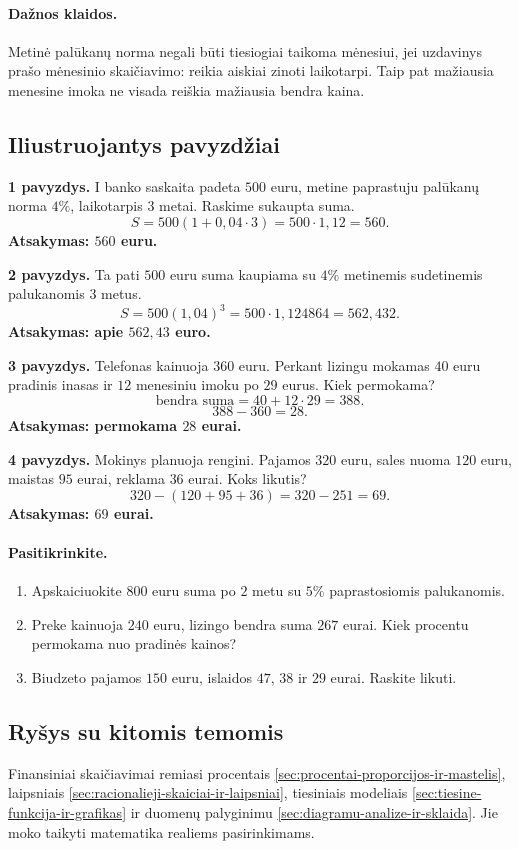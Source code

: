 \paragraph{Dažnos klaidos.}
Metinė palūkanų norma negali būti tiesiogiai taikoma mėnesiui, jei uzdavinys prašo mėnesinio skaičiavimo: reikia aiskiai zinoti laikotarpi. Taip pat mažiausia menesine imoka ne visada reiškia mažiausia bendra kaina.

\subsection{Iliustruojantys pavyzdžiai}
\textbf{1 pavyzdys.} I banko saskaita padeta $500$ euru, metine paprastuju palūkanų norma $4\%$, laikotarpis $3$ metai. Raskime sukaupta suma.
\[
S=500(1+0{,}04\cdot3)=500\cdot1{,}12=560.
\]
\textbf{Atsakymas: $560$ euru.}

\textbf{2 pavyzdys.} Ta pati $500$ euru suma kaupiama su $4\%$ metinemis sudetinemis palukanomis $3$ metus.
\[
S=500(1{,}04)^3=500\cdot1{,}124864=562{,}432.
\]
\textbf{Atsakymas: apie $562{,}43$ euro.}

\textbf{3 pavyzdys.} Telefonas kainuoja $360$ euru. Perkant lizingu mokamas $40$ euru pradinis inasas ir $12$ menesiniu imoku po $29$ eurus. Kiek permokama?
\[
\text{bendra suma}=40+12\cdot29=388.
\]
\[
388-360=28.
\]
\textbf{Atsakymas: permokama $28$ eurai.}

\textbf{4 pavyzdys.} Mokinys planuoja rengini. Pajamos $320$ euru, sales nuoma $120$ euru, maistas $95$ eurai, reklama $36$ eurai. Koks likutis?
\[
320-(120+95+36)=320-251=69.
\]
\textbf{Atsakymas: $69$ eurai.}

\paragraph{Pasitikrinkite.}
\begin{enumerate}[label=\alph*)]
\item Apskaiciuokite $800$ euru suma po $2$ metu su $5\%$ paprastosiomis palukanomis.
\item Preke kainuoja $240$ euru, lizingo bendra suma $267$ eurai. Kiek procentu permokama nuo pradinės kainos?
\item Biudzeto pajamos $150$ euru, islaidos $47$, $38$ ir $29$ eurai. Raskite likuti.
\end{enumerate}

\subsection{Ryšys su kitomis temomis}
Finansiniai skaičiavimai remiasi procentais \ref{sec:procentai-proporcijos-ir-mastelis}, laipsniais \ref{sec:racionalieji-skaiciai-ir-laipsniai}, tiesiniais modeliais \ref{sec:tiesine-funkcija-ir-grafikas} ir duomenų palyginimu \ref{sec:diagramu-analize-ir-sklaida}. Jie moko taikyti matematika realiems pasirinkimams.

